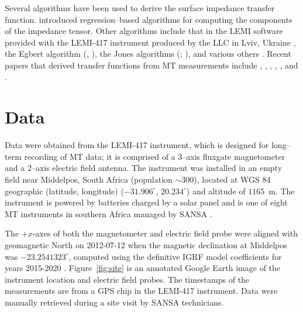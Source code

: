 \documentclass[pdflatex,sn-basic]{sn-jnl}%
\begin{document}

Several algorithms have been used to derive the surface impedance transfer function. \cite{Sims1971} introduced regression--based algorithms for computing the components of the impedance tensor. Other algorithms include that in the LEMI software provided with the LEMI-417 instrument produced by the LLC in Lviv, Ukraine \cite{LEMI2025}, the Egbert algorithm (\cite{Egbert1997}, \cite{Egbert2011}), the Jones algorithms (\cite{Jones1989}; \cite{Chave2012}), and various others \cite{Larsen1996}. Recent papers that derived transfer functions from MT measurements include \cite{Jones1989}, \cite{Moorkamp2007}, \cite{Fujii2015}, \cite{Heyns2020}, \cite{Weigel2019}, and \cite{Chen2021}.



\section{Data}
\label{section:Data}

Data were obtained from the LEMI-417 instrument, which is designed for long--term recording of MT data; it is comprised of a 3--axis fluxgate magnetometer and a 2--axis electric field antenna. The instrument was installed in an empty field near Middelpos, South Africa (population $\sim$300), located at WGS 84 geographic (latitude, longitude) ($-31.906^\circ$, $20.234^\circ$) and altitude of $1165$~m. The instrument is powered by batteries charged by a solar panel and   is one of eight MT instruments in southern Africa managed by SANSA \citep{Kotz2015}.

The $+x$-axes of both the magnetometer and electric field probe were aligned with geomagnetic North on 2012-07-12 when the magnetic declination at Middelpos was $-23.2541323^\circ$, computed using the definitive IGRF model coefficients for years 2015-2020 \citep{Alken2021}. Figure~\ref{fig:site} is an annotated Google Earth image of the instrument location and electric field probes. The timestamps of the measurements are from a GPS chip in the LEMI-417 instrument. Data were manually retrieved during a site visit by SANSA technicians.
\end{document}
